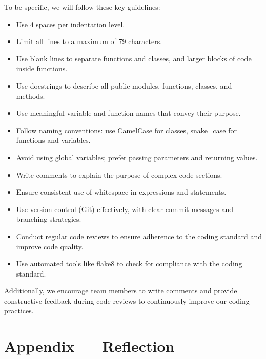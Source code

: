 \documentclass{article}
\begin{document}
To be specific, we will follow these key guidelines:
\begin{itemize}
  \item Use 4 spaces per indentation level.
  \item Limit all lines to a maximum of 79 characters.
  \item Use blank lines to separate functions and classes, and larger blocks of code inside functions.
  \item Use docstrings to describe all public modules, functions, classes, and methods.
  \item Use meaningful variable and function names that convey their purpose.
  \item Follow naming conventions: use CamelCase for classes, snake\_case for functions and variables.
  \item Avoid using global variables; prefer passing parameters and returning values.
  \item Write comments to explain the purpose of complex code sections.
  \item Ensure consistent use of whitespace in expressions and statements.
  \item Use version control (Git) effectively, with clear commit messages and branching strategies.
  \item Conduct regular code reviews to ensure adherence to the coding standard and improve code quality.
  \item Use automated tools like flake8 to check for compliance with the coding standard.
\end{itemize}

Additionally, we encourage team members to write comments and provide constructive feedback during code reviews
to continuously improve our coding practices.

\newpage{}

\section*{Appendix --- Reflection}


 
\end{document}
